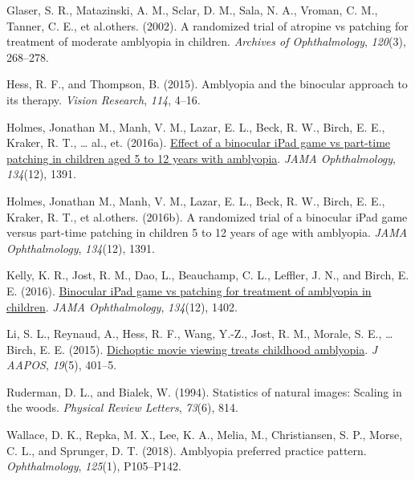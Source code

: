 \documentclass[
  onecolumn]{article}
\newlength{\cslhangindent}
\newenvironment{CSLReferences}[2] %
 {%
  \setlength{\parindent}{0pt}
  \ifodd #1 \everypar{\setlength{\hangindent}{\cslhangindent}}\ignorespaces\fi
  \ifnum #2 > 0
  \setlength{\parskip}{#2\baselineskip}
  \fi
 }%
 {}
\begin{document}
\begin{CSLReferences}{1}{0}
\leavevmode{}%
Glaser, S. R., Matazinski, A. M., Sclar, D. M., Sala, N. A., Vroman, C.
M., Tanner, C. E., et al.others. (2002). A randomized trial of atropine
vs patching for treatment of moderate amblyopia in children.
\emph{Archives of Ophthalmology}, \emph{120}(3), 268--278.

\leavevmode{}%
Hess, R. F., and Thompson, B. (2015). Amblyopia and the binocular
approach to its therapy. \emph{Vision Research}, \emph{114}, 4--16.

\leavevmode{}%
Holmes, Jonathan M., Manh, V. M., Lazar, E. L., Beck, R. W., Birch, E.
E., Kraker, R. T., \ldots{} al., et. (2016a).
\href{https://doi.org/10.1001/jamaophthalmol.2016.4262}{Effect of a
binocular iPad game vs part-time patching in children aged 5 to 12 years
with amblyopia}. \emph{JAMA Ophthalmology}, \emph{134}(12), 1391.

\leavevmode{}%
Holmes, Jonathan M., Manh, V. M., Lazar, E. L., Beck, R. W., Birch, E.
E., Kraker, R. T., et al.others. (2016b). A randomized trial of a
binocular iPad game versus part-time patching in children 5 to 12 years
of age with amblyopia. \emph{JAMA Ophthalmology}, \emph{134}(12), 1391.

\leavevmode{}%
Kelly, K. R., Jost, R. M., Dao, L., Beauchamp, C. L., Leffler, J. N.,
and Birch, E. E. (2016).
\href{https://doi.org/10.1001/jamaophthalmol.2016.4224}{Binocular iPad
game vs patching for treatment of amblyopia in children}. \emph{JAMA
Ophthalmology}, \emph{134}(12), 1402.

\leavevmode{}%
Li, S. L., Reynaud, A., Hess, R. F., Wang, Y.-Z., Jost, R. M., Morale,
S. E., \ldots{} Birch, E. E. (2015).
\href{https://doi.org/10.1016/j.jaapos.2015.08.003}{Dichoptic movie
viewing treats childhood amblyopia}. \emph{J AAPOS}, \emph{19}(5),
401--5.

\leavevmode{}%
Ruderman, D. L., and Bialek, W. (1994). Statistics of natural images:
Scaling in the woods. \emph{Physical Review Letters}, \emph{73}(6), 814.

\leavevmode{}%
Wallace, D. K., Repka, M. X., Lee, K. A., Melia, M., Christiansen, S.
P., Morse, C. L., and Sprunger, D. T. (2018). Amblyopia preferred
practice pattern{\textregistered}. \emph{Ophthalmology}, \emph{125}(1),
P105--P142.


\end{CSLReferences}
\end{document}
